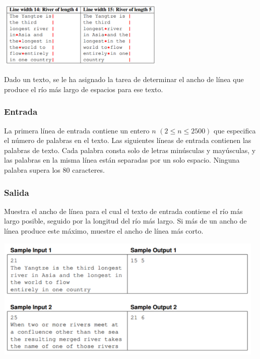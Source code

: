 \documentclass[12pt]{article}
\begin{document}
\begin{center}
	\includegraphics[width=8cm]{images/image2.png}
\end{center}

Dado un texto, se le ha asignado la tarea de determinar el ancho de línea que produce el río más largo de espacios para ese texto.

\subsubsection{Entrada}

La primera línea de entrada contiene un entero $n$ $(2 \leqslant n \leqslant 2500)$ que especifica el número de palabras en el texto. Las siguientes líneas de entrada contienen las palabras de texto. Cada palabra consta solo de letras minúsculas y mayúsculas, y las palabras en la misma línea están separadas por un solo espacio. Ninguna palabra supera los $80$ caracteres.

\subsubsection{Salida}

Muestra el ancho de línea para el cual el texto de entrada contiene el río más largo posible, seguido por la longitud del río más largo. Si más de un ancho de línea produce este máximo, muestre el ancho de línea más corto.

\begin{center}
	\includegraphics[width=13cm]{images/image3.png}
\end{center}
\end{document}
